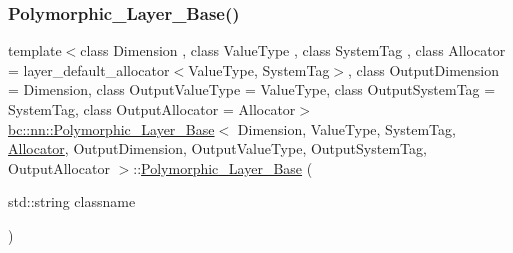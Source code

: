 \subsubsection{\texorpdfstring{Polymorphic\+\_\+\+Layer\+\_\+\+Base()}{Polymorphic\_Layer\_Base()}\hspace{0.1cm}{\footnotesize\ttfamily [1/2]}}
{\footnotesize\ttfamily template$<$class Dimension , class Value\+Type , class System\+Tag , class Allocator  = layer\+\_\+default\+\_\+allocator$<$\+Value\+Type, System\+Tag$>$, class Output\+Dimension  = Dimension, class Output\+Value\+Type  = Value\+Type, class Output\+System\+Tag  = System\+Tag, class Output\+Allocator  = Allocator$>$ \\
\hyperlink{structbc_1_1nn_1_1Polymorphic__Layer__Base}{bc\+::nn\+::\+Polymorphic\+\_\+\+Layer\+\_\+\+Base}$<$ Dimension, Value\+Type, System\+Tag, \hyperlink{classbc_1_1allocators_1_1Allocator}{Allocator}, Output\+Dimension, Output\+Value\+Type, Output\+System\+Tag, Output\+Allocator $>$\+::\hyperlink{structbc_1_1nn_1_1Polymorphic__Layer__Base}{Polymorphic\+\_\+\+Layer\+\_\+\+Base} (\begin{DoxyParamCaption}\item[{std\+::string}]{classname }\end{DoxyParamCaption})\hspace{0.3cm}{\ttfamily [inline]}}

\mbox{\label{structbc_1_1nn_1_1Polymorphic__Layer__Base_a6d3d973826a90e84e1f1ef3127198388}} 
